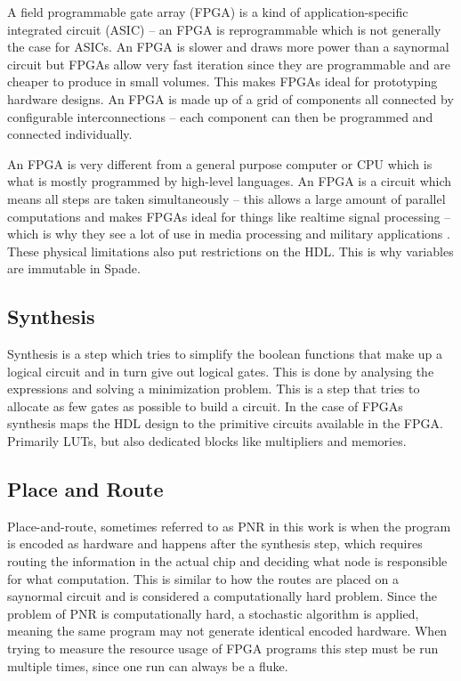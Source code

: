 A field programmable gate array (FPGA) is a kind of application-specific integrated circuit (ASIC) -- an FPGA is reprogrammable which is not generally the case for ASICs. An FPGA is slower and draws more power than a say{normal} circuit but FPGAs allow very fast iteration since they are programmable and are cheaper to produce in small volumes. This makes FPGAs ideal for prototyping hardware designs. An FPGA is made up of a grid of components all connected by configurable interconnections -- each component can then be programmed and connected individually. \cite{src:FPGA}

An FPGA is very different from a general purpose computer or CPU which is what is mostly programmed by high-level languages. An FPGA is a circuit which means all steps are taken simultaneously -- this allows a large amount of parallel computations and makes FPGAs ideal for things like realtime signal processing -- which is why they see a lot of use in media processing and military applications \cite{src:FPGAApplications}. These physical limitations also put restrictions on the HDL. This is why variables are immutable in Spade.

\subsection{Synthesis}
Synthesis is a step which tries to simplify the boolean functions that make up a logical circuit and in turn give out logical gates. This is done by analysing the expressions and solving a minimization problem. This is a step that tries to allocate as few gates as possible to build a circuit. In the case of FPGAs synthesis maps the HDL design to the primitive circuits available in the FPGA. Primarily LUTs, but also dedicated blocks like multipliers and memories.

\subsection{Place and Route}
Place-and-route, sometimes referred to as PNR in this work is when the program is encoded as hardware and happens after the synthesis step, which requires routing the information in the actual chip and deciding what node is responsible for what computation. This is similar to how the routes are placed on a say{normal} circuit and is considered a computationally hard problem. Since the problem of PNR is computationally hard, a stochastic algorithm is applied, meaning the same program may not generate identical encoded hardware. When trying to measure the resource usage of FPGA programs this step must be run multiple times, since one run can always be a fluke.
